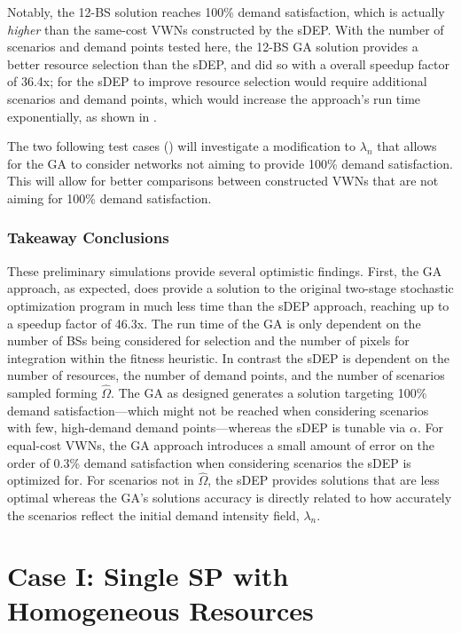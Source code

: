 \documentclass[12pt,dvipsnames]{report}
\begin{document}
Notably, the 12-BS solution reaches 100\% demand satisfaction, which is actually \emph{higher} than the same-cost VWNs constructed by the sDEP.  With the number of scenarios and demand points tested here, the 12-BS GA solution provides a better resource selection than the sDEP, and did so with a overall speedup factor of 36.4x; for the sDEP to improve resource selection would require additional scenarios and demand points, which would increase the approach's run time exponentially, as shown in .

The two following test cases () will investigate a modification to $\lambda_n$ that allows for the GA to consider networks not aiming to provide 100\% demand satisfaction.  This will allow for better comparisons between constructed VWNs that are not aiming for 100\% demand satisfaction.

\subsubsection{Takeaway Conclusions}

These preliminary simulations provide several optimistic findings.  First, the GA approach, as expected, does provide a solution to the original two-stage stochastic optimization program in much less time than the sDEP approach, reaching up to a speedup factor of 46.3x.  The run time of the GA is only dependent on the number of BSs being considered for selection and the number of pixels for integration within the fitness heuristic.  In contrast the sDEP is dependent on the number of resources, the number of demand points, and the number of scenarios sampled forming $\hat{\Omega}$.  The GA as designed generates a solution targeting 100\% demand satisfaction---which might not be reached when considering scenarios with few, high-demand demand points---whereas the sDEP is tunable via $\alpha$.  For equal-cost VWNs, the GA approach introduces a small amount of error on the order of 0.3\% demand satisfaction when considering scenarios the sDEP is optimized for.  For scenarios not in $\hat{\Omega}$, the sDEP provides solutions that are less optimal whereas the GA's solutions accuracy is directly related to how accurately the scenarios reflect the initial demand intensity field, $\lambda_n$.

\section{Case I: Single SP with Homogeneous Resources} \label{sec:caseI}
\end{document}
